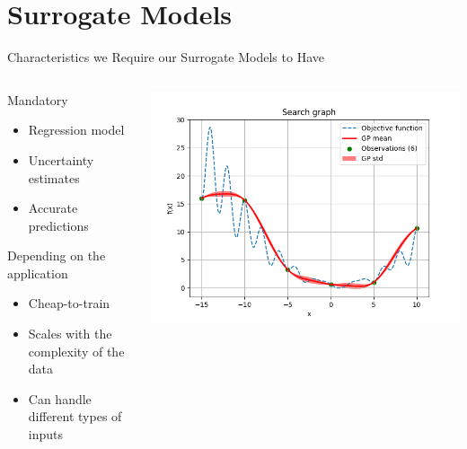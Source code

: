\section{Surrogate Models}
\begin{frame}[c]{Characteristics we Require our Surrogate Models to Have}

\begin{columns}[T] %
\begin{column}{.48\textwidth}
    \begin{block}{Mandatory}
    \begin{itemize}
    	\item Regression model
    	\item Uncertainty estimates
    	\item Accurate predictions
    \end{itemize}
    \end{block}
    
\pause
        \begin{block}{Depending on the application}
        \begin{itemize}
        	\item Cheap-to-train
        	\item Scales with the complexity of the data
        	\item Can handle different types of inputs
        \end{itemize}
        \end{block}
    
\end{column}%

\hfill%

\begin{column}{.48\textwidth}

\includegraphics[width=1.\textwidth]{images/bo_loop_overview/04_std.png}


\end{column}
\end{columns}
\end{frame}
